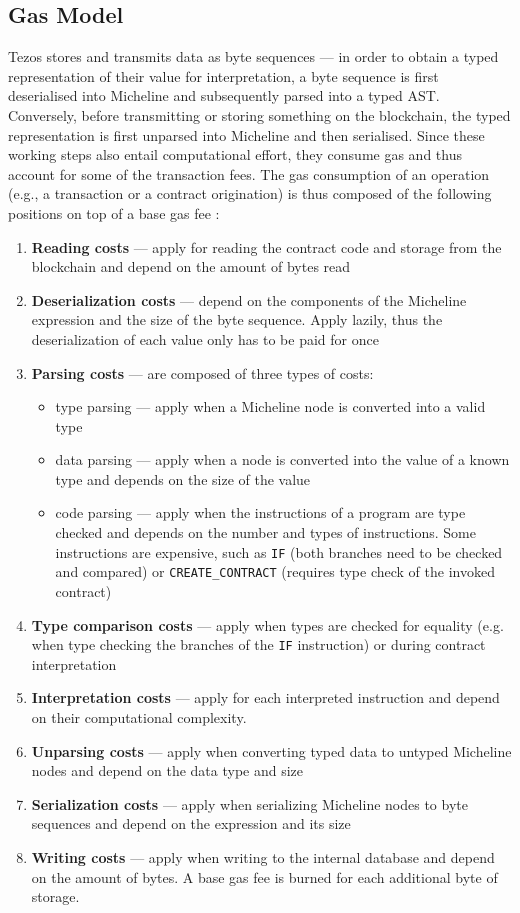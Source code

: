 \subsection{Gas Model}
Tezos stores and transmits data as byte sequences --- in order to obtain a typed representation of their value for interpretation, a byte sequence is first deserialised into Micheline and subsequently parsed into a typed AST. Conversely, before transmitting or storing something on the blockchain, the typed representation is first unparsed into Micheline and then serialised. Since these working steps also entail computational effort, they consume gas and thus account for some of the transaction fees. The gas consumption of an operation (e.g., a transaction or a contract origination) is thus composed of the following positions on top of a base gas fee \cite{morley_gasmodel}\cite{tezos_repo}:
\begin{enumerate}
\item \textbf{Reading costs} --- apply for reading the contract code and storage from the blockchain and depend on the amount of bytes read
\item \textbf{Deserialization costs} --- depend on the components of the Micheline expression and the size of the byte sequence. Apply lazily, thus the deserialization of each value only has to be paid for once
\item \textbf{Parsing costs} --- are composed of three types of costs:
	\begin{itemize}
	\item type parsing --- apply when a Micheline node is converted into a valid type
	\item data parsing --- apply when a node is converted into the value of a known type and depends on the size of the value
	\item code parsing --- apply when the instructions of a program are type checked and depends on the number and types of instructions. Some instructions are expensive, such as \texttt{IF} (both branches need to be checked and compared) or \texttt{CREATE\_CONTRACT} (requires type check of the invoked contract)
	\end{itemize}
\item \textbf{Type comparison costs} --- apply when types are checked for equality (e.g. when type checking the branches of the \texttt{IF} instruction) or during contract interpretation
\item \textbf{Interpretation costs} --- apply for each interpreted instruction and depend on their computational complexity.
\item \textbf{Unparsing costs} --- apply when converting typed data to untyped Micheline nodes and depend on the data type and size
\item \textbf{Serialization costs} --- apply when serializing Micheline nodes to byte sequences and depend on the expression and its size
\item \textbf{Writing costs} --- apply when writing to the internal database and depend on the amount of bytes. A base gas fee is burned for each additional byte of storage.
\end{enumerate}
